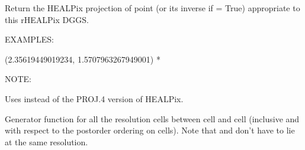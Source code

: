 \documentclass[a4paper,12ptopenany,oneside,english]{sphinxmanual}
\begin{document}
\begin{fulllineitems}
\begin{fulllineitems}
\end{fulllineitems}


\begin{fulllineitems}
\label{\detokenize{dggs:rhealpixdggs.dggs.RHEALPixDGGS.healpix}}
\pysigstartsignatures
{}
\pysigstopsignatures
\sphinxAtStartPar
Return the HEALPix projection of point  (or its inverse if
 = True) appropriate to this rHEALPix DGGS.

\sphinxAtStartPar
EXAMPLES:

\begin{sphinxVerbatim}[commandchars=\\\{\}]
  
  
\end{sphinxVerbatim}
\begin{description}
\sphinxAtStartPar
(\sphinxhyphen{}2.35619449019234, 1.5707963267949001) *

\end{description}

\sphinxAtStartPar
NOTE:

\sphinxAtStartPar
Uses  instead of the PROJ.4 version of HEALPix.

\end{fulllineitems}


\begin{fulllineitems}
\label{\detokenize{dggs:rhealpixdggs.dggs.RHEALPixDGGS.interval}}
\pysigstartsignatures
{}
\pysigstopsignatures
\sphinxAtStartPar
Generator function for all the resolution
 cells between cell
 and cell  (inclusive and with respect to the
postorder ordering on cells).
Note that  and  don’t have to lie at the same resolution.


\end{fulllineitems}
\end{fulllineitems}
\end{document}
